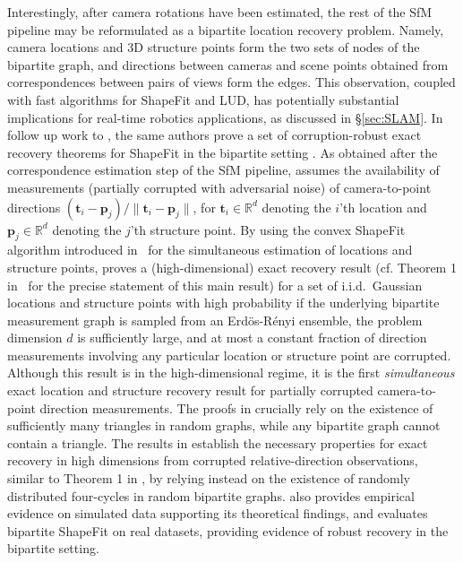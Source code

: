 \documentclass[10pt]{article}
\newcommand{\R}{\ensuremath{\mathbb{R}}}
\begin{document}
Interestingly, after camera rotations have been estimated, the rest of the SfM pipeline may be reformulated as a bipartite location recovery problem. Namely, camera locations and 3D structure points form the two sets of nodes of the bipartite graph, and directions between cameras and scene points obtained from correspondences between pairs of views form the edges. This observation, coupled with fast algorithms for ShapeFit and LUD, has potentially substantial implications for real-time robotics applications, as discussed in \S\ref{sec:SLAM}. In follow up work to \cite{ShapeFit}, the same authors prove a set of corruption-robust exact recovery theorems for ShapeFit in the bipartite setting \cite{ShapeFitJoint}. As obtained after the correspondence estimation step of the SfM pipeline, \cite{ShapeFitJoint} assumes the availability of measurements (partially corrupted with adversarial noise) of camera-to-point directions $(\mathbf{t}_i-\mathbf{p}_j)/\|\mathbf{t}_i-\mathbf{p}_j\|$, for $\mathbf{t}_i\in\R^d$ denoting the $i$'th location and $\mathbf{p}_j\in\R^d$ denoting the $j$'th structure point. By using the convex ShapeFit algorithm introduced in~\cite{ShapeFit} for the simultaneous estimation of locations and structure points, \cite{ShapeFitJoint} proves a (high-dimensional) exact recovery result (cf. Theorem 1 in~\cite{ShapeFitJoint} for the precise statement of this main result) for a set of i.i.d.~Gaussian locations and structure points with high probability if the underlying bipartite measurement graph is sampled from an Erd\"{o}s-R\'{e}nyi ensemble, the problem dimension $d$ is sufficiently large, and at most a constant fraction of direction measurements involving any particular location or structure point are corrupted. Although this result is in the high-dimensional regime, it is the first \textit{simultaneous} exact location and structure recovery result for partially corrupted camera-to-point direction measurements. The proofs in \cite{ShapeFit} crucially rely on the existence of sufficiently many triangles in random graphs, while any bipartite graph cannot contain a triangle. The results in \cite{ShapeFitJoint} establish the necessary properties for exact recovery in high dimensions from corrupted relative-direction observations, similar to Theorem 1 in \cite{ShapeFit}, by relying instead on the existence of randomly distributed four-cycles in random bipartite graphs. \cite{ShapeFitJoint} also provides empirical evidence on simulated data supporting its theoretical findings, and \cite{ShapeKick} evaluates bipartite ShapeFit on real datasets, providing evidence of robust recovery in the bipartite setting. 
\end{document}

